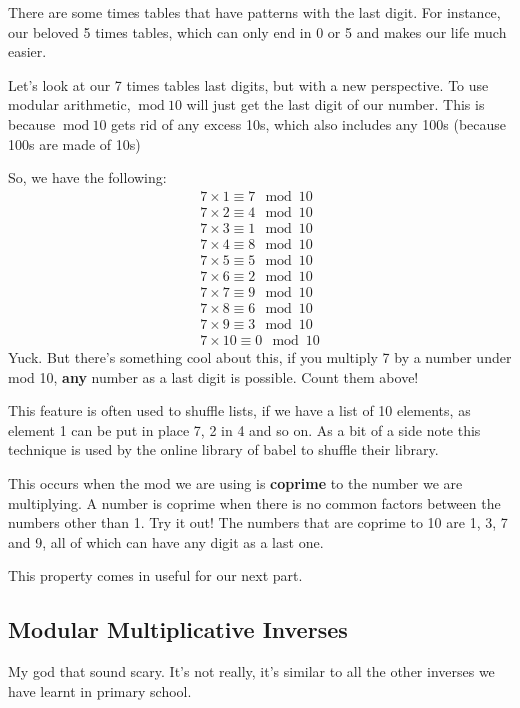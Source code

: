 \documentclass{article}
\newcommand{\inmod}{\ \text{mod}\ }
\begin{document}
  There are some times tables that have patterns with the last digit. For instance, our beloved 5 times tables, which can only end in 0 or 5 and makes our life much easier.

  Let's look at our 7 times tables last digits, but with a new perspective. To use modular arithmetic, $\inmod 10$ will just get the last digit of our number. This is because $\inmod 10$ gets rid of any excess 10s, which also includes any 100s (because 100s are made of 10s)

  So, we have the following:
  \begin{align}
    7 \times 1 \equiv 7 \mod 10 \\
    7 \times 2 \equiv 4 \mod 10 \\
    7 \times 3 \equiv 1 \mod 10 \\
    7 \times 4 \equiv 8 \mod 10 \\
    7 \times 5 \equiv 5 \mod 10 \\
    7 \times 6 \equiv 2 \mod 10 \\
    7 \times 7 \equiv 9 \mod 10 \\
    7 \times 8 \equiv 6 \mod 10 \\
    7 \times 9 \equiv 3 \mod 10 \\
    7 \times 10 \equiv 0 \mod 10 
  \end{align}
  Yuck. But there's something cool about this, if you multiply 7 by a number under mod 10, \textbf{any} number as a last digit is possible. Count them above!

  This feature is often used to shuffle lists, if we have a list of 10 elements,
  as element 1 can be put in place 7, 2 in 4 and so on. As a bit of a side note
  this technique is used by the online library of babel to shuffle their library.

  This occurs when the mod we are using is \textbf{coprime} to the number we are multiplying. A number is coprime when there is no common factors between the numbers other than 1. Try it out! The numbers that are coprime to 10 are 1, 3, 7 and 9, all of which can have any digit as a last one.
  
  This property comes in useful for our next part.

  \subsection*{Modular Multiplicative Inverses}
  My god that sound scary. It's not really, it's similar to all the other inverses
  we have learnt in primary school.
\end{document}
